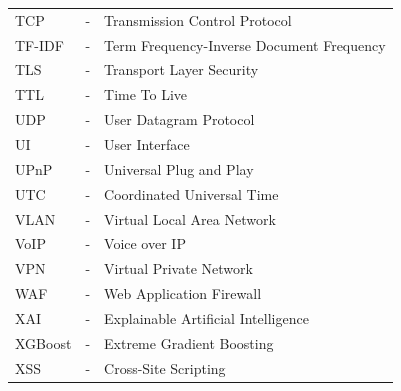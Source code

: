 \begin{longtable}{lcl}
TCP	& - & Transmission Control Protocol\\
TF-IDF	& - & Term Frequency-Inverse Document Frequency\\
TLS	& - & Transport Layer Security\\
TTL	& - & Time To Live\\
UDP	& - & User Datagram Protocol\\
UI	& - & User Interface\\
UPnP	& - & Universal Plug and Play\\
UTC	& - & Coordinated Universal Time\\
VLAN	& - & Virtual Local Area Network\\
VoIP	& - & Voice over IP\\
VPN	& - & Virtual Private Network\\
WAF	& - & Web Application Firewall\\
XAI	& - & Explainable Artificial Intelligence\\
XGBoost	& - & Extreme Gradient Boosting\\
XSS	& - & Cross-Site Scripting\\
\end{longtable}
